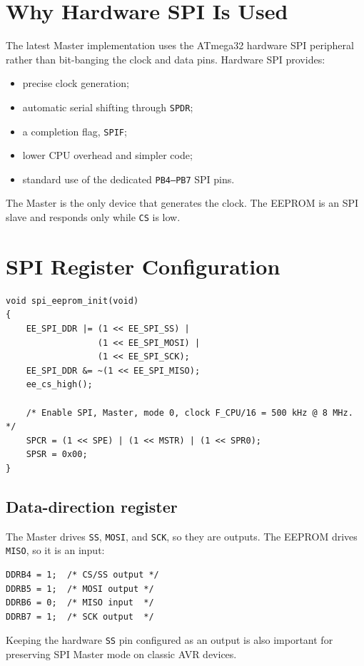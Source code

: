 \documentclass[11pt,a4paper]{article}
\begin{document}
\section{Why Hardware SPI Is Used}
The latest Master implementation uses the ATmega32 hardware SPI peripheral rather than bit-banging the clock and data pins. Hardware SPI provides:
\begin{itemize}
  \item precise clock generation;
  \item automatic serial shifting through \texttt{SPDR};
  \item a completion flag, \texttt{SPIF};
  \item lower CPU overhead and simpler code;
  \item standard use of the dedicated \texttt{PB4--PB7} SPI pins.
\end{itemize}

The Master is the only device that generates the clock. The EEPROM is an SPI slave and responds only while \texttt{CS} is low.

\section{SPI Register Configuration}

\begin{lstlisting}[style=cstyle,caption={SPI EEPROM initialization.}]
void spi_eeprom_init(void)
{
    EE_SPI_DDR |= (1 << EE_SPI_SS) |
                  (1 << EE_SPI_MOSI) |
                  (1 << EE_SPI_SCK);
    EE_SPI_DDR &= ~(1 << EE_SPI_MISO);
    ee_cs_high();

    /* Enable SPI, Master, mode 0, clock F_CPU/16 = 500 kHz @ 8 MHz. */
    SPCR = (1 << SPE) | (1 << MSTR) | (1 << SPR0);
    SPSR = 0x00;
}
\end{lstlisting}

\subsection{Data-direction register}
The Master drives \texttt{SS}, \texttt{MOSI}, and \texttt{SCK}, so they are outputs. The EEPROM drives \texttt{MISO}, so it is an input:
\begin{lstlisting}[style=cstyle]
DDRB4 = 1;  /* CS/SS output */
DDRB5 = 1;  /* MOSI output */
DDRB6 = 0;  /* MISO input  */
DDRB7 = 1;  /* SCK output  */
\end{lstlisting}
Keeping the hardware \texttt{SS} pin configured as an output is also important for preserving SPI Master mode on classic AVR devices.
\end{document}

